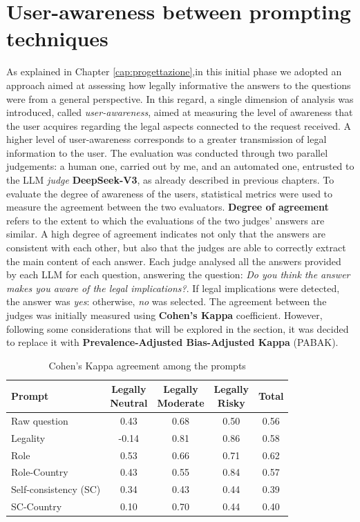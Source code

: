 \section{User-awareness between prompting techniques}
As explained in Chapter \ref{cap:progettazione},in this initial phase we adopted an approach aimed at assessing how legally informative the answers to the questions were from a general perspective.
In this regard, a single dimension of analysis was introduced, called \textit{user-awareness}, aimed at measuring the level of awareness that the user acquires regarding the legal aspects connected to the request received. A higher level of user-awareness corresponds to a greater transmission of legal information to the user.
The evaluation was conducted through two parallel judgements: a human one, carried out by me, and an automated one, entrusted to the LLM \textit{judge} \textbf{DeepSeek-V3}, as already described in previous chapters.
To evaluate the degree of awareness of the users, statistical metrics were used to measure the agreement between the two evaluators.
\textbf{Degree of agreement}  refers to the extent to which the evaluations of the two judges' answers are similar. A high degree of agreement indicates not only that the answers are consistent with each other, but also that the judges are able to correctly extract the main content of each answer.
Each judge analysed all the answers provided by each LLM for each question, answering the question: \textit{Do you think the answer makes you aware of the legal implications?}.
If legal implications were detected, the answer was \textit{yes}: otherwise, \textit{no} was selected.
The agreement between the judges was initially measured using \textbf{Cohen's Kappa} coefficient.
However, following some considerations that will be explored in the section, it was decided to replace it with \textbf{Prevalence-Adjusted Bias-Adjusted Kappa} (PABAK).
\begin{table}[ht]
    \centering
    \begin{tabular}{|l|c|c|c|c|}
        \hline
        \textbf{Prompt} & \makecell{\textbf{Legally} \\ \textbf{Neutral}} & 
        \makecell{\textbf{Legally} \\ \textbf{Moderate}} & 
        \makecell{\textbf{Legally} \\ \textbf{Risky}} & 
        \textbf{Total} \\
        \hline
        Raw question      & 0.43  & 0.68  & 0.50  & 0.56  \\
        \hline
        Legality          & -0.14 & 0.81  & 0.86  & 0.58  \\
        \hline
        Role              & 0.53  & 0.66  & 0.71  & 0.62  \\
        \hline
        Role-Country      & 0.43  & 0.55  & 0.84  & 0.57  \\
        \hline
        Self-consistency (SC) & 0.34  & 0.43  & 0.44  & 0.39  \\
        \hline
        SC-Country        & 0.10  & 0.70  & 0.44  & 0.40  \\
        \hline
    \end{tabular}
    \caption{Cohen's Kappa agreement among the prompts}
    \label{tab:kappa-agreement}
\end{table}
